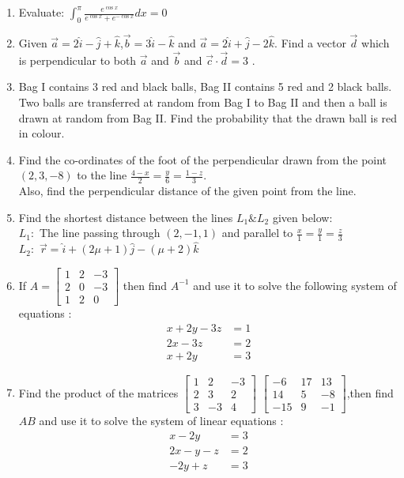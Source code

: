 \documentclass{article}
\providecommand{\myvec}[1]{\ensuremath{\begin{bmatrix}#1 \end{bmatrix}}}
\begin{document}
\begin{enumerate}
\item Evaluate: $\int_{0}^{\pi}\frac{e^{\cos{x}}}{e^{\cos{x}} + e^{-\cos{x}}}dx = 0$

\item Given $\vec{a}=2\hat{i}-\hat{j}+\hat{k}$,$\vec{b}=3\hat{i}-\hat{k}$ and $\vec{a}=2\hat{i}+\hat{j}-2\hat{k}$. Find a vector $\vec{d}$ which is perpendicular to both $\vec{a}$ and $\vec{b}$ and $\vec{c}\cdot\vec{d}=3$ .

\item Bag I contains 3 red and black balls, Bag II contains 5 red and 2 black balls. Two balls are transferred at random from Bag I to Bag II and then a ball is drawn at random from Bag II. Find the probability that the drawn ball is red in colour.


\item Find the co-ordinates of the foot of the perpendicular drawn from the point $(2,3,-8)$ to the line $\frac{4-x}{2} = \frac{y}{6} = \frac{1-z}{3}$.\\
Also, find the perpendicular distance of the given point from the line.

\item Find the shortest distance between the lines $L_{1} \& L_{2}$ given below:\\
	$L_{1}:$ The line passing through $(2,-1,1)$  and parallel to $ \frac{x}{1} = \frac{y}{1}=\frac{z}{3}$\\
		$L_{2}:$  $\vec{r}= \hat{i}+(2\mu + 1)\hat{j}-(\mu + 2)\hat{k}$


\item If $A=\myvec{ 1 & 2 & -3\\2 & 0 & -3\\1 & 2 & 0}$ then find $A^{-1}$ and use it to solve the following system of equations :
	\begin{align*}  x + 2y -3z&= 1\\
		2x-3z & =2\\
                x+ 2y &=3 \end{align*}

\item Find the product of the matrices $\myvec{ 1 & 2 & -3\\2 & 3 & 2\\3 & -3 & 4}$ $\myvec{  -6 & 17 & 13\\14 & 5 & -8\\-15 & 9 & -1}$,then find $AB$ and use it to solve the system of linear equations :
\begin{align*} x - 2y &= 3\\2x - y - z &= 2\\-2y + z &= 3\end{align*}



\end{enumerate}
\end{document}
